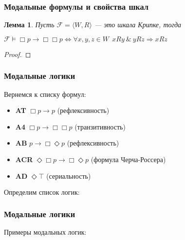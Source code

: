 \documentclass[pdf,utf8,russian,aspectratio=169]{beamer}
\newtheorem{lem}{Лемма}
\begin{document}
\begin{frame}
  \frametitle{Модальные формулы и свойства шкал}

  \begin{lem} Пусть $\mathcal{F} = \langle W, R \rangle$ --- это шкала Крипке, тогда

    $\mathcal{F} \models \Box p \to \Box \Box p \Leftrightarrow \forall x, y, z \in W \:\: x R y \: \& \: y R z \Rightarrow x R z$
  \end{lem}

\begin{proof}
        
\end{proof}
\end{frame}

\begin{frame}
  \frametitle{Модальные логики}

  Вернемся к списку формул:

  \begin{itemize}
    \item {\bf AT} $\Box p \to p$ (рефлексивность)
    \item {\bf A4} $\Box p \to \Box \Box p$ (транзитивность)
    \item {\bf AB} $p \to \Box \Diamond p$ (рефлексивность)
    \item {\bf ACR} $\Diamond \Box p \to \Box \Diamond p$ (формула Черча-Россера)
    \item {\bf AD} $\Diamond \top$ (сериальность)
  \end{itemize}

  Определим список логик:
\end{frame}

\begin{frame}
  \frametitle{Модальные логики}

  Примеры модальных логик:

\begin{itemize}
\end{itemize}
\end{frame}
\end{document}
